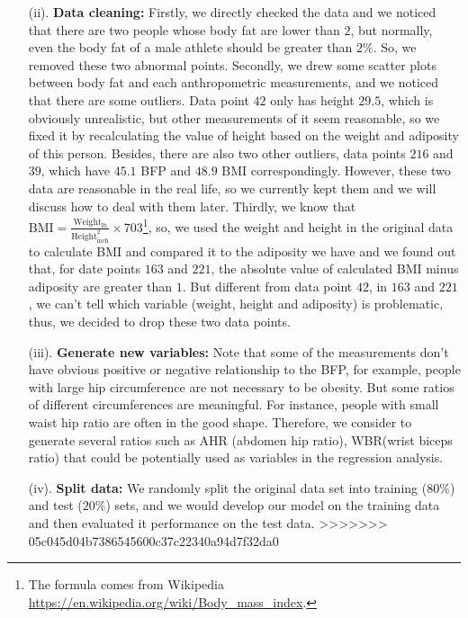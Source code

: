 \documentclass[letterpaper,10pt]{article}
\begin{document}
\begin{itemize}
\item[(ii).] \textbf{Data cleaning:} Firstly, we directly checked the data and we noticed that there are two people whose body fat are lower than $2$, but normally, even the body fat of a male athlete should be greater than $2\%$. So, we removed these two abnormal points. Secondly, we drew some scatter plots between body fat and each anthropometric measurements, and we noticed that there are some outliers. Data point $42$ only has height $29.5$, which is obviously unrealistic, but other measurements of it seem reasonable, so we fixed it by recalculating the value of height based on the weight and adiposity of this person. Besides, there are also two other outliers, data points $216$ and $39$, which have $45.1$ BFP and $48.9$ BMI correspondingly. However, these two data are reasonable in the real life, so we currently kept them and we will discuss how to deal with them later. Thirdly, we know that $\text{BMI} = \frac{\text{Weight}_{\text{lb}}}{\text{Height}_{\text{inch}}^2} \times 703$\footnote{The formula comes from Wikipedia \url{https://en.wikipedia.org/wiki/Body_mass_index}.}, so, we used the weight and height in the original data to calculate BMI and compared it to the adiposity we have and we found out that, for date points $163$ and $221$, the absolute value of calculated BMI minus adiposity are greater than $1$. But different from data point $42$, in $163$ and $221$, we can't tell which variable (weight, height and adiposity) is problematic, thus, we decided to drop these two data points.
\item[(iii).] \textbf{Generate new variables:} Note that some of the measurements don't have obvious positive or negative relationship to the BFP, for example, people with large hip circumference are not necessary to be obesity. But some ratios of different circumferences are meaningful. For instance, people with small waist hip ratio are often in the good shape. Therefore, we consider to generate several ratios such as AHR (abdomen hip ratio), WBR(wrist biceps ratio) that could be potentially used as variables in the regression analysis.
\item[(iv).] \textbf{Split data:} We randomly split the original data set into training ($80\%$) and test ($20\%$) sets, and we would develop our model on the training data and then evaluated it performance on the test data.
>>>>>>> 05c045d04b7386545600c37c22340a94d7f32da0
\end{itemize}
\end{document}
